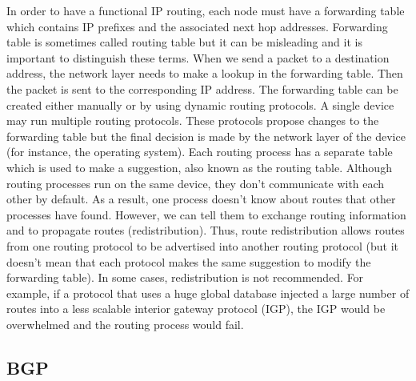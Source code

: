 \documentclass[a4paper]{article}
\begin{document}
In order to have a functional IP routing, each node must have a forwarding table which contains IP prefixes and the associated next hop addresses. Forwarding table is sometimes called routing table but it can be misleading and it is important to distinguish these terms. When we send a packet to a destination address, the network layer needs to make a lookup in the forwarding table. Then the packet is sent to the corresponding IP address. The forwarding table can be created either manually or by using dynamic routing protocols. A single device may run multiple routing protocols. These protocols propose changes to the forwarding table but the final decision is made by the network layer of the device (for instance, the operating system). Each routing process has a separate table which is used to make a suggestion, also known as the routing table. Although routing processes run on the same device, they don't communicate with each other by default. As a result, one process doesn't know about routes that other processes have found. However, we can tell them to exchange routing information and to propagate routes (redistribution). Thus, route redistribution allows routes from one routing protocol to be advertised into another routing protocol (but it doesn't mean that each protocol makes the same suggestion to modify the forwarding table). In some cases, redistribution is not recommended. For example, if a protocol that uses a huge global database injected a large number of routes into a less scalable interior gateway protocol (IGP), the IGP would be overwhelmed and the routing process would fail.

\subsection{BGP}
\end{document}
